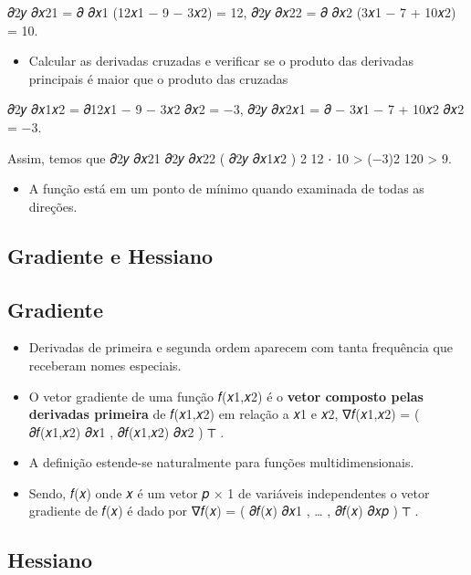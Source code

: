 \documentclass[
]{article}
\providecommand{\tightlist}{%
  \setlength{\itemsep}{0pt}\setlength{\parskip}{0pt}}
\begin{document}
𝜕2𝑦 𝜕𝑥21 = 𝜕 𝜕𝑥1 (12𝑥1 − 9 − 3𝑥2) = 12, 𝜕2𝑦 𝜕𝑥22 = 𝜕 𝜕𝑥2 (3𝑥1 − 7 +
10𝑥2) = 10.

\begin{itemize}
\tightlist
\item
  Calcular as derivadas cruzadas e verificar se o produto das derivadas
  principais é maior que o produto das cruzadas
\end{itemize}

𝜕2𝑦 𝜕𝑥1𝑥2 = 𝜕12𝑥1 − 9 − 3𝑥2 𝜕𝑥2 = −3, 𝜕2𝑦 𝜕𝑥2𝑥1 = 𝜕 − 3𝑥1 − 7 + 10𝑥2 𝜕𝑥2
= −3.

Assim, temos que 𝜕2𝑦 𝜕𝑥21 𝜕2𝑦 𝜕𝑥22 ( 𝜕2𝑦 𝜕𝑥1𝑥2 ) 2 12 ⋅ 10
\textgreater{} (−3)2 120 \textgreater{} 9.

\begin{itemize}
\tightlist
\item
  A função está em um ponto de mínimo quando examinada de todas as
  direções.
\end{itemize}

\hypertarget{gradiente-e-hessiano}{%
\subsection{Gradiente e Hessiano}\label{gradiente-e-hessiano}}

\hypertarget{gradiente}{%
\subsection{Gradiente}\label{gradiente}}

\begin{itemize}
\tightlist
\item
  Derivadas de primeira e segunda ordem aparecem com tanta frequência
  que receberam nomes especiais.
\item
  O vetor gradiente de uma função 𝑓(𝑥1,𝑥2) é o \textbf{vetor composto
  pelas derivadas primeira} de 𝑓(𝑥1,𝑥2) em relação a 𝑥1 e 𝑥2, ∇𝑓(𝑥1,𝑥2)
  = ( 𝜕𝑓(𝑥1,𝑥2) 𝜕𝑥1 , 𝜕𝑓(𝑥1,𝑥2) 𝜕𝑥2 ) ⊤ .
\item
  A definição estende-se naturalmente para funções multidimensionais.
\item
  Sendo, 𝑓(𝑥) onde 𝑥 é um vetor 𝑝 × 1 de variáveis independentes o vetor
  gradiente de 𝑓(𝑥) é dado por ∇𝑓(𝑥) = ( 𝜕𝑓(𝑥) 𝜕𝑥1 , \ldots{} , 𝜕𝑓(𝑥)
  𝜕𝑥𝑝 ) ⊤ .
\end{itemize}

\hypertarget{hessiano}{%
\subsection{Hessiano}\label{hessiano}}
\end{document}
